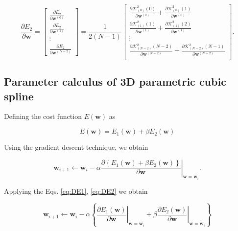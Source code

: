 \begin{equation}\label{eq:DE2}
\frac{\partial E_{2}}{\partial \mathbf{w}}
=
\begin{bmatrix}
\frac{\partial E_{2}}{\partial \mathbf{w}^{(0)}}\\[4pt]
\frac{\partial E_{2}}{\partial \mathbf{w}^{(1)}}\\[4pt]
\vdots\\[4pt]
\frac{\partial E_{2}}{\partial \mathbf{w}^{(N-2)}}
\end{bmatrix}
=
\frac{1}{2(N-1)}
\begin{bmatrix}
%
\frac{
\partial 
\mathcal{K}_{(0)}^{2}(0)
}{\partial \mathbf{w}^{(0)}}
+
\frac{
\partial 
\mathcal{K}_{(0)}^{2}(1)
}{\partial \mathbf{w}^{(0)}}\\[4pt]
%
\frac{
\partial 
\mathcal{K}_{(1)}^{2}(1)
}{\partial \mathbf{w}^{(1)}}
+
\frac{
\partial 
\mathcal{K}_{(1)}^{2}(2)
}{\partial \mathbf{w}^{(1)}}\\[4pt]
%
\vdots\\[4pt]
\frac{
\partial 
\mathcal{K}_{(N-2)}^{2}(N-2)
}{\partial \mathbf{w}^{(N-2)}}
+
\frac{
\partial 
\mathcal{K}_{(N-2)}^{2}(N-1)
}{\partial \mathbf{w}^{(N-2)}}\\
%
\end{bmatrix}
.
\end{equation}

\subsection{Parameter calculus of 3D parametric cubic spline}
\label{sec:solvecubicspline}

Defining the cost function $E(\mathbf{w})$ as

\begin{equation}
E(\mathbf{w})=E_{1}(\mathbf{w})+\beta E_{2}(\mathbf{w})
\end{equation}

Using the gradient descent technique, we obtain

\begin{equation}
\mathbf{w}_{i+1}
\leftarrow 
\mathbf{w}_{i}
-
\alpha
\left.
\frac{\partial 
\left\{
E_{1}(\mathbf{w})+\beta E_{2}(\mathbf{w})
\right\}
}{\partial \mathbf{w}}
\right|_{\mathbf{w}=\mathbf{w}_{i}}.
\end{equation}

Applying the Eqs. \ref{eq:DE1}, \ref{eq:DE2} we obtain

\begin{equation}
\mathbf{w}_{i+1}
\leftarrow 
\mathbf{w}_{i}
-
\alpha
\left\{
\left.
\frac{\partial E_{1}(\mathbf{w})}{\partial \mathbf{w}}
\right|_{\mathbf{w}=\mathbf{w}_{i}}
+
\beta
\left.
\frac{\partial E_{2}(\mathbf{w})}{\partial \mathbf{w}}
\right|_{\mathbf{w}=\mathbf{w}_{i}}
\right\}
\end{equation}

